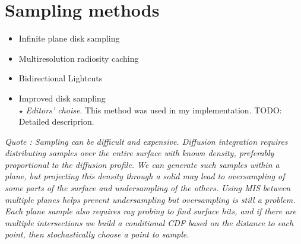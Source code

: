 \section{Sampling methods}
\label{sampling_methods}
\begin{itemize}
    \item{Infinite plane disk sampling \cite{Jensen:2001:PMS:383259.383319}}
    \item{Multiresolution radiosity caching \cite{Christensen:2012:MRC:2343045.2343108}}
    \item{Bidirectional Lightcuts \cite{Walter:2012:BL:2185520.2185555}}
    \item{Improved disk sampling \cite{King:2013:BIS:2504459.2504520}}\\
    $\star$ \textit{Editors' choise}. This method was used in my implementation.
    TODO: Detailed descriprion.
\end{itemize}

\emph{Quote \cite{Burley:disney_siggraph15}: Sampling can be difficult and expensive. Diffusion
integration requires distributing samples over the entire surface with known
density, preferably proportional to the diffusion profile. We can generate
such samples within a plane, but projecting this density through a solid may
lead to oversampling of some parts of the surface and undersampling of the
others.
Using MIS between multiple planes \cite{King:2013:BIS:2504459.2504520}  helps prevent
undersampling but oversampling is still a problem. Each plane sample also
requires ray probing to find surface hits, and if there are multiple
intersections we build a conditional CDF based on the distance to each point,
then stochastically choose a point to sample.}